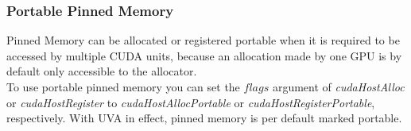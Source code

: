 \subsubsection{Portable Pinned Memory}
Pinned Memory can be allocated or registered portable when it is required to be accessed by multiple CUDA units,
because an allocation made by one GPU is by default only accessible to the allocator.\\
To use portable pinned memory you can set the $flags$ argument of \emph{cudaHostAlloc} or \emph{cudaHostRegister} to \emph{cudaHostAllocPortable} or \emph{cudaHostRegisterPortable}, respectively.
With UVA in effect, pinned memory is per default marked portable.

